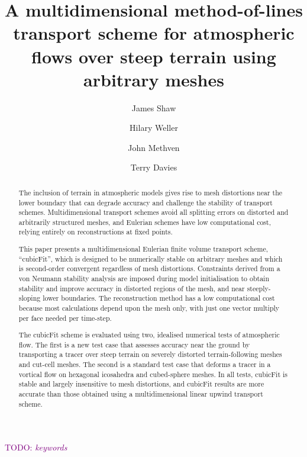 \documentclass[times]{elsarticle}
\newcommand{\TODO}[1]{\textcolor{purple}{TODO: \emph{#1}}}
\begin{document}
\begin{frontmatter}
\title{A multidimensional method-of-lines transport scheme for atmospheric flows over steep terrain using arbitrary meshes}
\author[uor]{James Shaw}
\author[uor]{Hilary Weller}
\author[uor]{John Methven}
\author[mo]{Terry Davies}

\address[uor]{Department of Meteorology, University of Reading, Reading, United Kingdom}
\address[mo]{Met Office, Exeter, United Kingdom}

\begin{abstract}
The inclusion of terrain in atmospheric models gives rise to mesh distortions near the lower boundary that can degrade accuracy and challenge the stability of transport schemes.
Multidimensional transport schemes avoid all splitting errors on distorted and arbitrarily structured meshes, and Eulerian schemes have low computational cost, relying entirely on reconstructions at fixed points.

This paper presents a multidimensional Eulerian finite volume transport scheme, ``cubicFit'', which is designed to be numerically stable on arbitrary meshes and which is second-order convergent regardless of mesh distortions.
Constraints derived from a von Neumann stability analysis are imposed during model initialisation to obtain stability and improve accuracy in distorted regions of the mesh, and near steeply-sloping lower boundaries.
The reconstruction method has a low computational cost because most calculations depend upon the mesh only, with just one vector multiply per face needed per time-step.

The cubicFit scheme is evaluated using two, idealised numerical tests of atmospheric flow.  The first is a new test case that assesses accuracy near the ground by transporting a tracer over steep terrain on severely distorted terrain-following meshes and cut-cell meshes.
The second is a standard test case that deforms a tracer in a vortical flow on hexagonal icosahedra and cubed-sphere meshes.
In all tests, cubicFit is stable and largely insensitive to mesh distortions, and cubicFit results are more accurate than those obtained using a multidimensional linear upwind transport scheme.
\end{abstract}

\begin{keyword}
	\TODO{keywords}
\end{keyword}
\end{frontmatter}
\end{document}
